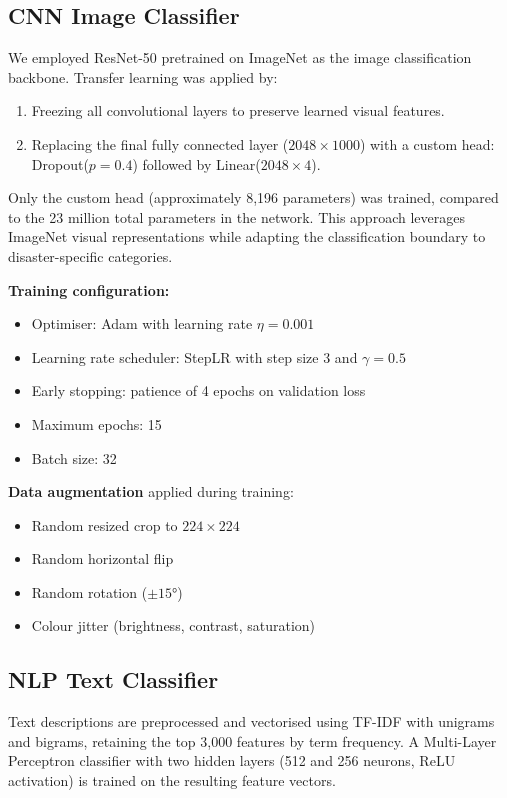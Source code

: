 \documentclass[conference]{IEEEtran}
\begin{document}
\subsection{CNN Image Classifier}

We employed ResNet-50 \cite{he2016deep} pretrained on ImageNet as the image classification backbone. Transfer learning was applied by:
\begin{enumerate}
    \item Freezing all convolutional layers to preserve learned visual features.
    \item Replacing the final fully connected layer ($2048 \times 1000$) with a custom head: Dropout($p=0.4$) followed by Linear($2048 \times 4$).
\end{enumerate}

Only the custom head (approximately 8,196 parameters) was trained, compared to the 23 million total parameters in the network. This approach leverages ImageNet visual representations while adapting the classification boundary to disaster-specific categories.

\textbf{Training configuration:}
\begin{itemize}
    \item Optimiser: Adam with learning rate $\eta = 0.001$
    \item Learning rate scheduler: StepLR with step size 3 and $\gamma = 0.5$
    \item Early stopping: patience of 4 epochs on validation loss
    \item Maximum epochs: 15
    \item Batch size: 32
\end{itemize}

\textbf{Data augmentation} applied during training:
\begin{itemize}
    \item Random resized crop to $224 \times 224$
    \item Random horizontal flip
    \item Random rotation ($\pm 15°$)
    \item Colour jitter (brightness, contrast, saturation)
\end{itemize}

\subsection{NLP Text Classifier}

Text descriptions are preprocessed and vectorised using TF-IDF with unigrams and bigrams, retaining the top 3,000 features by term frequency. A Multi-Layer Perceptron classifier with two hidden layers (512 and 256 neurons, ReLU activation) is trained on the resulting feature vectors.
\end{document}
